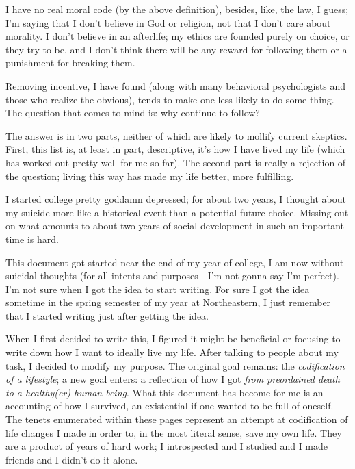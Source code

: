 \documentclass[./butidigress.tex]{subfiles}
\begin{document}
I have no real moral code (by the above definition), besides, like, the law, I guess; I'm saying that I don't believe in God or religion, not that I don't care about morality.
I don't believe in an afterlife; my ethics are founded purely on choice, or they try to be, and I don't think there will be any reward for following them or a punishment for breaking them.

Removing incentive, I have found (along with many behavioral psychologists and those who realize the obvious), tends to make one less likely to do some thing.
The question that comes to mind is: why continue to follow?

The answer is in two parts, neither of which are likely to mollify current skeptics.
First, this list is, at least in part, descriptive, it's how I have lived my life (which has worked out pretty well for me so far).
The second part is really a rejection of the question; living this way has made my life better, more fulfilling.

\label{sec:development}
I started college pretty goddamn depressed; for about two years, I thought about my suicide more like a historical event than a potential future choice.
Missing out on what amounts to about two years of social development in such an important time is hard.

This document got started near the end of my  year of college, I am now without suicidal thoughts (for all intents and purposes---I'm not gonna say I'm perfect).
I'm not sure when I got the idea to start writing.
For sure I got the idea sometime in the spring semester of my  year at Northeastern, I just remember that I started writing just after getting the idea.

When I first decided to write this, I figured it might be beneficial or focusing to write down how I want to ideally live my life.
After talking to people about my task, I decided to modify my purpose.
The original goal remains: the \emph{codification of a lifestyle}; a new goal enters: a reflection of how I got \emph{from preordained death to a healthy(er) human being}.
What this document has become for me is an accounting of how I survived, an existential  if one wanted to be full of oneself.
The tenets enumerated within these pages represent an attempt at codification of life changes I made in order to, in the most literal sense, save my own life.
They are a product of years of hard work; I introspected and I studied and I made friends and I didn't do it alone.
\end{document}
